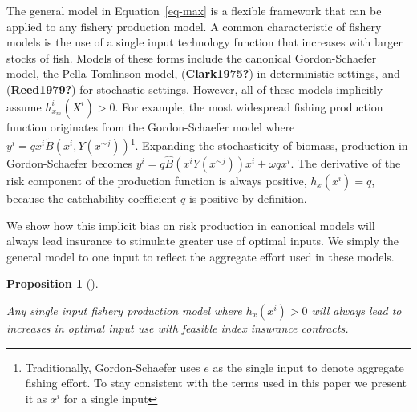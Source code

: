 \documentclass[
  letterpaper,
  DIV=11,
  numbers=noendperiod]{scrartcl}
\theoremstyle{plain}
\newtheorem{proposition}{Proposition}[section]
\theoremstyle{plain}
\theoremstyle{remark}
\begin{document}
The general model in Equation~\ref{eq-max} is a flexible framework that
can be applied to any fishery production model. A common characteristic
of fishery models is the use of a single input technology function that
increases with larger stocks of fish. Models of these forms include the
canonical Gordon-Schaefer model, the Pella-Tomlinson model,
(\textbf{Clark1975?}) in deterministic settings, and
(\textbf{Reed1979?}) for stochastic settings. However, all of these
models implicitly assume \(h^i_{x_m}(X^i)>0\). For example, the most
widespread fishing production function originates from the
Gordon-Schaefer model where
\(y^i=qx^i\tilde{B}(x^i,Y(x^{\sim j}))\)\footnote{Traditionally,
  Gordon-Schaefer uses \(e\) as the single input to denote aggregate
  fishing effort. To stay consistent with the terms used in this paper
  we present it as \(x^i\) for a single input}. Expanding the
stochasticity of biomass, production in Gordon-Schaefer becomes
\(y^i=q\hat{B}(x^iY(x^{\sim j}))x^i+\omega qx^i\). The derivative of the
risk component of the production function is always positive,
\(h_{x}(x^i)=q\), because the catchability coefficient \(q\) is positive
by definition.

We show how this implicit bias on risk production in canonical models
will always lead insurance to stimulate greater use of optimal inputs.
We simply the general model to one input to reflect the aggregate effort
used in these models.

\begin{proposition}[]\protect\hypertarget{prp-cp}{}\label{prp-cp}

Any single input fishery production model where \(h_{x}(x^i)>0\) will
always lead to increases in optimal input use with feasible index
insurance contracts.

\end{proposition}
\end{document}
